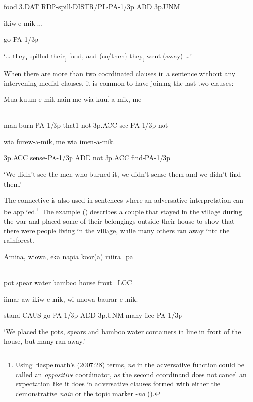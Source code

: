 food  3.DAT  RDP-spill-DISTR/PL-PA-1/3p  ADD  3p.UNM

ikiw-e-mik ...

go-PA-1/3p

`{\dots} they\textsubscript{i} spilled their\textsubscript{j} food, and (so/then) they\textsubscript{j} went (away) {\dots}'

When there are more than two coordinated clauses in a sentence without any intervening medial clauses, it is common to have   joining the last two clauses:

\ea%
\label{ex:x1374}
\gll Mua  kuum-e-mik  nain  me  wia  kuuf-a-mik,  me  \\
      \\
\glt
\z

man  burn-PA-1/3p  that1  not  3p.ACC  see-PA-1/3p  not

wia  furew-a-mik,    me  wia  imen-a-mik.

3p.ACC  sense-PA-1/3p  ADD  not  3p.ACC  find-PA-1/3p

`We didn't see the men who burned it, we didn't sense them and we didn't find them.'

The connective   is also used in sentences where an adversative interpretation can be applied.\footnote{Using Haspelmath's (2007:28) terms, \textit{ne} in the adversative function could be called an \textit{oppositive} coordinator, as the second coordinand does not cancel an expectation like it does in adversative clauses formed with either the demonstrative \textit{nain} or the topic marker -\textit{na} ().}  The example () describes a couple that stayed in the village during the war and placed some of their belongings outside their house to show that there were people living in the village, while many others ran away into the rainforest. 

\ea%
\label{ex:x1375}
\gll Amina,  wiowa,  eka  napia  koor(a)  miira=pa  \\
      \\
\glt
\z

pot  spear  water  bamboo  house  front=LOC

iimar-aw-ikiw-e-mik,    wi  unowa  baurar-e-mik.

stand-CAUS-go-PA-1/3p  ADD  3p.UNM  many  flee-PA-1/3p

`We placed the pots, spears and bamboo water containers in line in front of the house, but many ran away.'

